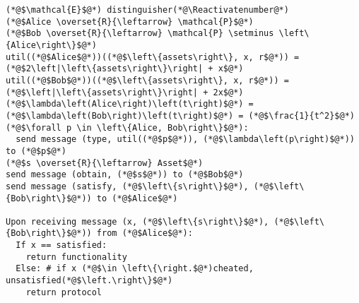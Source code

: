 \Suppressnumber
\begin{lstlisting}[label=distenv, style=numbers]
(*@$\mathcal{E}$@*) distinguisher(*@\Reactivatenumber@*)
(*@$Alice \overset{R}{\leftarrow} \mathcal{P}$@*)
(*@$Bob \overset{R}{\leftarrow} \mathcal{P} \setminus \left\{Alice\right\}$@*)
util((*@$Alice$@*))((*@$\left\{assets\right\}, x, r$@*)) = (*@$2\left|\left\{assets\right\}\right| + x$@*)
util((*@$Bob$@*))((*@$\left\{assets\right\}, x, r$@*)) = (*@$\left|\left\{assets\right\}\right| + 2x$@*)
(*@$\lambda\left(Alice\right)\left(t\right)$@*) = (*@$\lambda\left(Bob\right)\left(t\right)$@*) = (*@$\frac{1}{t^2}$@*)
(*@$\forall p \in \left\{Alice, Bob\right\}$@*):
  send message (type, util((*@$p$@*)), (*@$\lambda\left(p\right)$@*)) to (*@$p$@*)
(*@$s \overset{R}{\leftarrow} Asset$@*)
send message (obtain, (*@$s$@*)) to (*@$Bob$@*)
send message (satisfy, (*@$\left\{s\right\}$@*), (*@$\left\{Bob\right\}$@*)) to (*@$Alice$@*)

Upon receiving message (x, (*@$\left\{s\right\}$@*), (*@$\left\{Bob\right\}$@*)) from (*@$Alice$@*):
  If x == satisfied:
    return functionality
  Else: # if x (*@$\in \left\{\right.$@*)cheated, unsatisfied(*@$\left.\right\}$@*)
    return protocol
\end{lstlisting}
